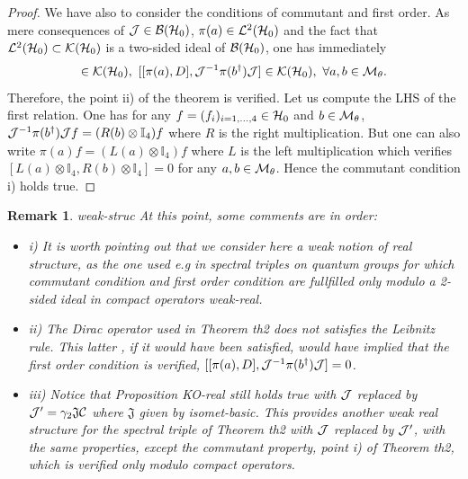 \documentclass[10pt]{book}
\theoremstyle{break}
\newtheorem{remark}{Remark}
\begin{document}
\begin{proof}
We have also to consider the conditions of commutant and first order. As mere consequences of ${\cal{J}}\in{\cal{B}}({\cal{H}}_0)$, $\pi(a)\in{\cal{L}}^2({\cal{H}}_0)$ and the fact that ${\cal{L}}^2({\cal{H}}_0)\subset{\cal{K}}({\cal{H}}_0)$ is a two-sided ideal of ${\cal{B}}({\cal{H}}_0)$, one has immediately
\begin{equation}
[\pi(a),{\cal{J}}^{-1}\pi(b^\dag){\cal{J}}]\in{\cal{K}}({\cal{H}}_0),\ [[\pi(a),D],{\cal{J}}^{-1}\pi(b^\dag){\cal{J}}]\in{\cal{K}}({\cal{H}}_0),\ \forall 
a,b\in{\cal{M}}_\theta.
\end{equation}
Therefore, the point ii) of the theorem is verified. Let us compute the LHS of the first relation. One has for any $f=(f_i)_{i=1,...,4}\in{\cal{H}}_0$ and $b\in{\cal{M}}_\theta$,  ${\cal{J}}^{-1}\pi(b^\dag){\cal{J}}f=(R(b)\otimes\mathbb{I}_4)f$ where $R$ is the right multiplication. But one can also write $\pi(a) f=(L(a)\otimes\mathbb{I}_4)f$ where $L$ is the left multiplication which verifies $[L(a)\otimes\mathbb{I}_4,R(b)\otimes\mathbb{I}_4]=0$ for any $a,b\in{\cal{M}}_\theta$. Hence the commutant condition i) holds true.
\end{proof}
\begin{remark}{weak-struc} At this point, some comments are in order:
\begin{itemize}
\vspace*{-4pt}
\setlength{\itemsep}{-1pt}
\item i) It is worth pointing out that we consider here a weak notion of real structure, as the one used e.g in spectral triples on quantum groups for which commutant condition and first order condition are fullfilled only modulo a 2-sided ideal in compact operators {weak-real}.
\item ii) The Dirac operator used in Theorem {th2} does not satisfies the Leibnitz rule. This latter , if it would have been satisfied, would have implied that the first order condition is verified, $[[\pi(a),D],{\cal{J}}^{-1}\pi(b^\dag){\cal{J}}]=0$.
\item iii) Notice that Proposition {KO-real} still holds true with ${\cal{J}}$ replaced by ${\cal{J}}^\prime=\gamma_2\mathfrak{J}{\cal{C}} $ where $\mathfrak{J}$ given by {isomet-basic}. This provides another weak real structure for the spectral triple of 
Theorem {th2} with ${\cal{J}}$ replaced by ${\cal{J}}^\prime$, with the same properties, except the commutant property, point i) of Theorem {th2}, which is verified only modulo compact operators.
\end{itemize}
\end{remark}
\end{document}
